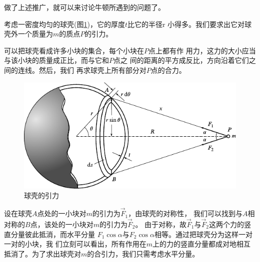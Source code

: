 做了上述推广，就可以来讨论牛顿所遇到的问题了。

考虑一密度均匀的球壳(图\ref{fig:04.10})，它的厚度$ t $比它的半径$  $r
小得多。我们要求出它对球壳外一个质量为$ m $的质点$ P $的引力。

可以把球壳看成许多小块的集合，每个小块在$ P $点上都有作
用力，这力的大小应当与该小块的质量成正比，而与它和$ P $点之
间的距离的平方成反比，方向沿着它们之间的连线。然后，我们
再求球壳上所有部分对$ P $点的合力。
\begin{figure}[h]
  \centering
  \includegraphics{figure/fig04.10}
  \caption{球壳的引力}
  \label{fig:04.10}
\end{figure}

设在球壳$ A $点处的一小块对$ m $的引力为$ \vec{F} _ { 1 } $，由球壳的对称性，
我们可以找到与$ A $相对称的$ B $点，该处的一小块对$ m $的引力为$ \vec{F} _ { 2 } $。
由于对称，故$ \vec{F} _ { 1 } $与$ \vec{F} _ { 2 } $这两个力的竖直分量彼此抵消，而水平分量
$ F _ { 1 } \cos \alpha $与$ F _ { 2 } \cos \alpha $相等。通过把球壳分为这样一对一对的小块，我
们立刻可以看出，所有作用在$ m $上的力的竖直分量都成对地相互
抵消了。为了求出球壳对$ m $的合引力，我们只需考虑水平分量。

